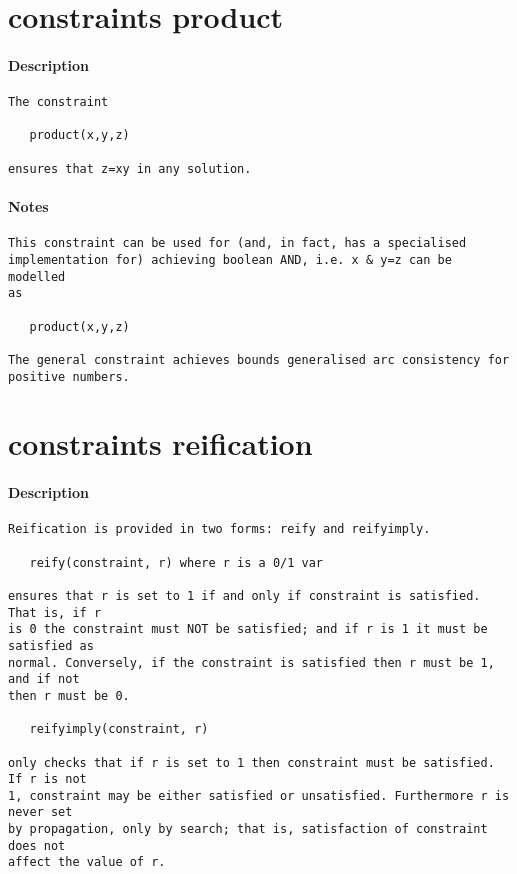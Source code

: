 \section{constraints product}
\paragraph{Description}
{\footnotesize
\begin{verbatim}
The constraint

   product(x,y,z)

ensures that z=xy in any solution.
\end{verbatim}
}
\paragraph{Notes}
{\footnotesize
\begin{verbatim}
This constraint can be used for (and, in fact, has a specialised
implementation for) achieving boolean AND, i.e. x & y=z can be modelled
as

   product(x,y,z)

The general constraint achieves bounds generalised arc consistency for
positive numbers.
\end{verbatim}
}
\section{constraints reification}
\paragraph{Description}
{\footnotesize
\begin{verbatim}
Reification is provided in two forms: reify and reifyimply.

   reify(constraint, r) where r is a 0/1 var

ensures that r is set to 1 if and only if constraint is satisfied. That is, if r
is 0 the constraint must NOT be satisfied; and if r is 1 it must be satisfied as
normal. Conversely, if the constraint is satisfied then r must be 1, and if not
then r must be 0.

   reifyimply(constraint, r)

only checks that if r is set to 1 then constraint must be satisfied. If r is not
1, constraint may be either satisfied or unsatisfied. Furthermore r is never set
by propagation, only by search; that is, satisfaction of constraint does not
affect the value of r.
\end{verbatim}
}
